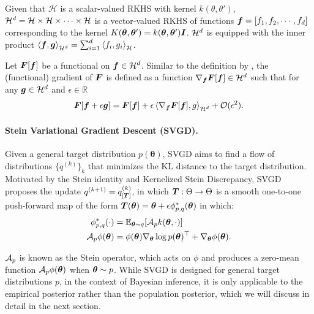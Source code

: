 Given that $\mathcal{H}$ is a scalar-valued RKHS with kernel $k(\theta, \theta')$, ${\mathcal{H}}^d = {\mathcal{H}} \times {\mathcal{H}} \times \cdots \times {\mathcal{H}}$ is a vector-valued RKHS of functions ${\bm{f}} = [f_1, f_2, \cdots, f_d]$ corresponding to the kernel $K({\bm{\theta}}, {\bm{\theta}}')=k({\bm{\theta}},{\bm{\theta}}'){\bm{I}}$. ${\mathcal{H}}^d$ is equipped with the inner product $\left< {\bm{f}}, {\bm{g}}\right>_{{\mathcal{H}}^d} = \sum_{i=1}^d \left<f_i, g_i \right>_{\mathcal{H}}$. 

Let ${\bm{F}}[{\bm{f}}]$ be a functional on ${\bm{f}}\in{\mathcal{H}}^d$. Similar to the definition by \cite{svgd}, the (functional) gradient of ${\bm{F}}$ is defined as a function $\nabla_{\bm{f}} {\bm{F}}[{\bm{f}}] \in {\mathcal{H}}^d$ such that for any ${\bm{g}} \in {\mathcal{H}}^d$ and $\epsilon \in \mathbb{R}$
\begin{equation}
    \label{eq: functional gradient}
    {\bm{F}}[{\bm{f}}+\epsilon {\bm{g}}] = {\bm{F}}[{\bm{f}}]+\epsilon\left<\nabla_{{\bm{f}}}{\bm{F}}[{\bm{f}}], g\right>_{{\mathcal{H}}^d}+{\mathcal{O}}(\epsilon^2).
\end{equation}

\vspace{-3mm}

\paragraph{Stein Variational Gradient Descent (SVGD).} Given a general target distribution $p(\boldsymbol{\theta})$, SVGD \citep{svgd} aims to find a flow of distributions $\{q^{(k)}\}_k$ that minimizes the KL distance to the target distribution. Motivated by the Stein identity and Kernelized Stein Discrepancy, SVGD proposes the update $q^{(k+1)} = q^{(k)}_{[{\bm{T}}]}$, in which ${\bm{T}}: \Theta \to \Theta$ is a smooth one-to-one push-forward map of the form ${\bm{T}}({\bm{\theta}}) = {\bm{\theta}} + \epsilon \phi^*_{p,q}({\bm{\theta}})$ in which:
\begin{align*}
    \phi^*_{p, q}(\cdot) &= \mathbb{E}_{{\bm{\theta}} \sim q}[{\mathcal{A}}_p k({\bm{\theta}}, \cdot)] \\ {\mathcal{A}}_p \phi({\bm{\theta}}) &= \phi({\bm{\theta}}) \nabla_{\bm{\theta}} \log p({\bm{\theta}})^\top + \nabla_{\bm{\theta}} \phi({\bm{\theta}}).
\end{align*}

${\mathcal{A}}_p$ is known as the Stein operator, which acts on $\phi$ and produces a zero-mean function ${\mathcal{A}}_p \phi({\bm{\theta}})$ when ${\bm{\theta}} \sim p$. While SVGD is designed for general target distributions $p$, in the context of Bayesian inference, it is only applicable to the empirical posterior rather than the population posterior, which we will discuss in detail in the next section.
